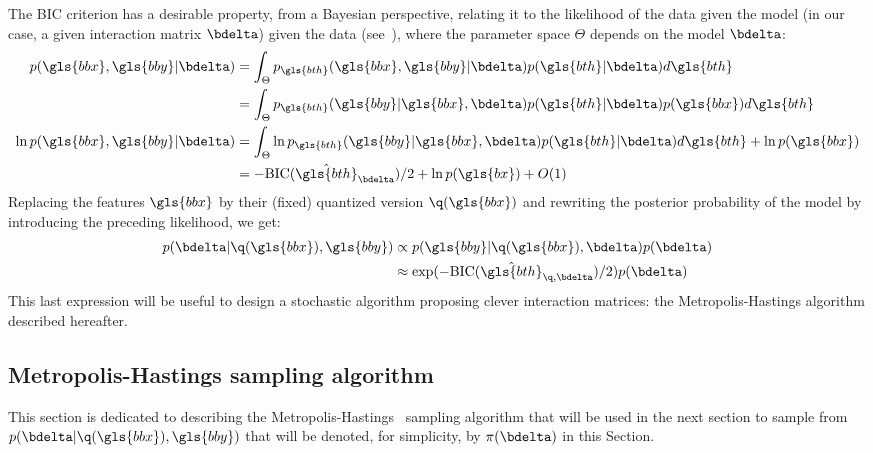 The BIC criterion has a desirable property, from a Bayesian perspective, relating it to the likelihood of the data given the model (in our case, a given interaction matrix $\bdelta$) given the data (see~\cite{lebarbier}), where the parameter space $\Theta$ depends on the model $\bdelta$:
\begin{align*}
p(\gls{bbx}, \gls{bby} | \bdelta) & = \int_{\Theta} p_{\gls{bth}}(\gls{bbx}, \gls{bby} | \bdelta) p(\gls{bth} | \bdelta)d\gls{bth} \\
 & = \int_{\Theta} p_{\gls{bth}}(\gls{bby} | \gls{bbx}, \bdelta) p(\gls{bth} | \bdelta) p(\gls{bbx}) d\gls{bth} \\
\ln p(\gls{bbx}, \gls{bby} | \bdelta) & = \int_{\Theta} \ln p_{\gls{bth}}(\gls{bby} | \gls{bbx}, \bdelta) p(\gls{bth} | \bdelta) d\gls{bth} + \ln p(\gls{bbx}) \\
 & = -\text{BIC}(\hat{\gls{bth}}_{\bdelta})/2 + \ln p(\gls{bx}) + O(1)
\end{align*}
Replacing the features $\gls{bbx}$ by their (fixed) quantized version $\q(\gls{bbx})$ and rewriting the posterior probability of the model by introducing the preceding likelihood, we get:
\begin{align*}
p(\bdelta | \q(\gls{bbx}),\gls{bby}) & \propto p(\gls{bby} | \q(\gls{bbx}), \bdelta) p(\bdelta) \\
& \approx \exp(-\text{BIC}(\hat{\gls{bth}}_{\q,\bdelta})/2) p(\bdelta)
\end{align*}
This last expression will be useful to design a stochastic algorithm proposing clever interaction matrices: the Metropolis-Hastings algorithm described hereafter.

\subsection{Metropolis-Hastings sampling algorithm}

This section is dedicated to describing the Metropolis-Hastings~\cite{hastings1970monte} sampling algorithm that will be used in the next section to sample from $p(\bdelta | \q(\gls{bbx}),\gls{bby})$ that will be denoted, for simplicity, by $\pi(\bdelta)$ in this Section.

